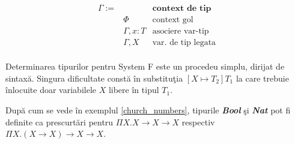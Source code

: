 \begin{multicols}{2}
\setlength\columnseprule{.4pt}
\begin{align*}
\Gamma := &             &\textbf{context de tip}\\
          & \Phi        &\text{context gol}\\
          &\Gamma,x:T   &\text{asociere var-tip}\\
          &\Gamma,X     &\text{var. de tip legata}\\
\end{align*}

\begin{prooftree}
\end{prooftree}

\begin{prooftree}
\end{prooftree}

\begin{prooftree}
\end{prooftree}

\begin{prooftree}
\end{prooftree}

\begin{prooftree}
\end{prooftree}

\end{multicols}

Determinarea tipurilor pentru System F este un procedeu simplu, dirijat de sintax\u a. Singura dificultate const\u a \^ in substitu\c tia $[X \mapsto T_2] T_1$ la care trebuie \^ inlocuite doar variabilele $X$ libere \^ in tipul $T_1$.

\begin{example}
Dup\u a cum se vede \^ in exemplul \ref{church_numbers}, tipurile \textbf{\emph{Bool}} \c si \textbf{\emph{Nat}} pot fi definite ca prescurt\u ari pentru $\Pi X. X \to X \to X$ respectiv $\Pi X. (X \to X) \to X\to X$.
\end{example}

